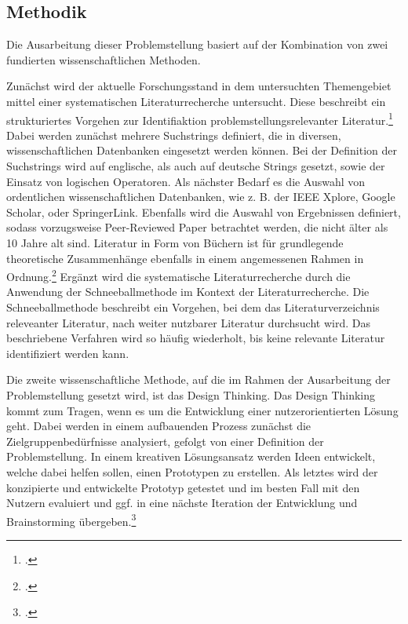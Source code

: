 \subsection{Methodik}
Die Ausarbeitung dieser Problemstellung basiert auf der Kombination von zwei fundierten wissenschaftlichen Methoden.

Zunächst wird der aktuelle Forschungsstand in dem untersuchten Themengebiet mittel einer systematischen Literaturrecherche untersucht.
Diese beschreibt ein strukturiertes Vorgehen zur Identifiaktion problemstellungsrelevanter Literatur.\footcite{brocke2015standing}
Dabei werden zunächst mehrere Suchstrings definiert, die in diversen, wissenschaftlichen Datenbanken eingesetzt werden können.
Bei der Definition der Suchstrings wird auf englische, als auch auf deutsche Strings gesetzt, sowie der Einsatz von logischen Operatoren.
Als nächster Bedarf es die Auswahl von ordentlichen wissenschaftlichen Datenbanken, wie z. B. der IEEE Xplore, Google Scholar, oder SpringerLink.
Ebenfalls wird die Auswahl von Ergebnissen definiert, sodass vorzugsweise Peer-Reviewed Paper betrachtet werden, die nicht älter als 10 Jahre alt sind.
Literatur in Form von Büchern ist für grundlegende theoretische Zusammenhänge ebenfalls in einem angemessenen Rahmen in Ordnung.\footcite{xiao2019guidance}
Ergänzt wird die systematische Literaturrecherche durch die Anwendung der Schneeballmethode im Kontext der Literaturrecherche.
Die Schneeballmethode beschreibt ein Vorgehen, bei dem das Literaturverzeichnis releveanter Literatur, nach weiter nutzbarer Literatur durchsucht wird.
Das beschriebene Verfahren wird so häufig wiederholt, bis keine relevante Literatur identifiziert werden kann.

Die zweite wissenschaftliche Methode, auf die im Rahmen der Ausarbeitung der Problemstellung gesetzt wird, ist das Design Thinking.
Das Design Thinking kommt zum Tragen, wenn es um die Entwicklung einer nutzerorientierten Lösung geht.
Dabei werden in einem aufbauenden Prozess zunächst die Zielgruppenbedürfnisse analysiert, gefolgt von einer Definition der Problemstellung.
In einem kreativen Lösungsansatz werden Ideen entwickelt, welche dabei helfen sollen, einen Prototypen zu erstellen.
Als letztes wird der konzipierte und entwickelte Prototyp getestet und im besten Fall mit den Nutzern evaluiert und ggf. in eine nächste Iteration der Entwicklung und Brainstorming übergeben.\footcite{heller2020design}